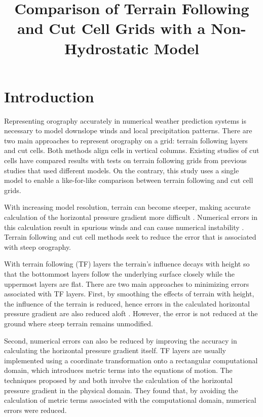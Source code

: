 \documentclass[twocol]{ametsoc}
\title{Comparison of Terrain Following and Cut Cell Grids with a Non-Hydrostatic Model}
\affiliation{}
\begin{document}
\newcommand{\TODO}[1]{\textcolor{purple}{TODO: \emph{#1}}}

\maketitle

\section{Introduction}
Representing orography accurately in numerical weather prediction systems is necessary to model downslope winds and local precipitation patterns.  There are two main approaches to represent orography on a grid: terrain following layers and cut cells.  Both methods align cells in vertical columns.  Existing studies of cut cells have compared results with tests on terrain following grids from previous studies that used different models.  On the contrary, this study uses a single model to enable a like-for-like comparison between terrain following and cut cell grids.

With increasing model resolution, terrain can become steeper, making accurate calculation of the horizontal pressure gradient more difficult \citep{gary1973,steppeler2002}.  Numerical errors in this calculation result in spurious winds and can cause numerical instability \citep{fast2003,webster2003}.  Terrain following and cut cell methods seek to reduce the error that is associated with steep orography.

With terrain following (TF) layers the terrain's influence decays with height so that the bottommost layers follow the underlying surface closely while the uppermost layers are flat.  There are two main approaches to minimizing errors associated with TF layers.  First, by smoothing the effects of terrain with height, the influence of the terrain is reduced, hence errors in the calculated horizontal pressure gradient are also reduced aloft \citep{schaer2002,leuenberger2010,klemp2011}.  However, the error is not reduced at the ground where steep terrain remains unmodified.

Second, numerical errors can also be reduced by improving the accuracy in calculating the horizontal pressure gradient itself.  TF layers are usually implemented using a coordinate transformation onto a rectangular computational domain, which introduces metric terms into the equations of motion.  The techniques proposed by \citet{klemp2011} and \cite{zaengl2012} both involve the calculation of the horizontal pressure gradient in the physical domain.  They found that, by avoiding the calculation of metric terms associated with the computational domain, numerical errors were reduced.
\end{document}
